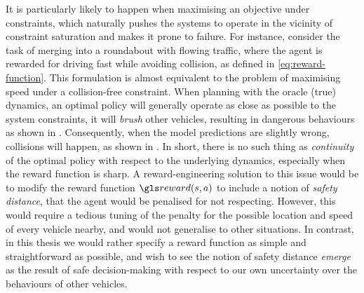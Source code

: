 It is particularly likely to happen when maximising an objective under constraints, which naturally pushes the systems to operate in the vicinity of constraint saturation and makes it prone to failure. For instance, consider the task of merging into a roundabout with flowing traffic, where the agent is rewarded for driving fast while avoiding collision, as defined in \eqref{eq:reward-function}. This formulation is almost equivalent to the problem of maximising speed under a collision-free constraint. When planning with the oracle (true) dynamics, an optimal policy will generally operate as close as possible to the system constraints, \ie it will \emph{brush} other vehicles, resulting in dangerous behaviours as shown in . Consequently, when the model predictions are slightly wrong, collisions will happen, as shown in . In short, there is no such thing as \emph{continuity} of the optimal policy with respect to the underlying dynamics, especially when the reward function is sharp. A reward-engineering solution to this issue would be to modify the reward function $\reward(s,a)$ to include a notion of \emph{safety distance}, that the agent would be penalised for not respecting. However, this would require a tedious tuning of the penalty for the possible location and speed of every vehicle nearby, and would not generalise to other situations. In contrast, in this thesis we would rather specify a reward function as simple and straightforward as possible, and wish to see the notion of safety distance \emph{emerge} as the result of safe decision-making with respect to our own uncertainty over the behaviours of other vehicles.

